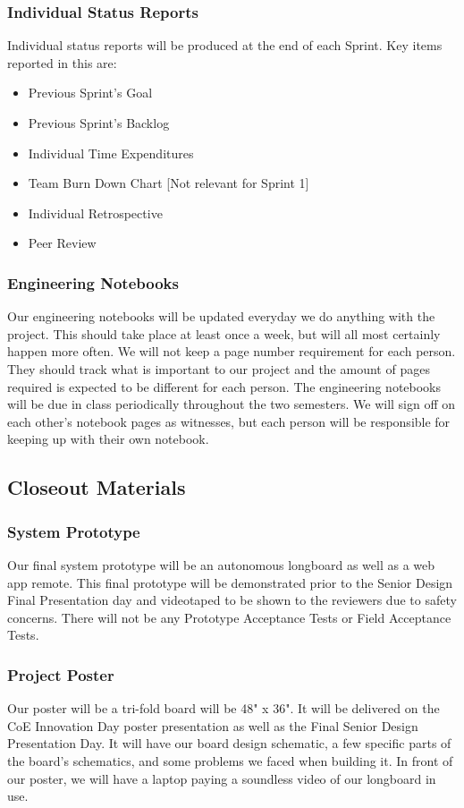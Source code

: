 \subsubsection{Individual Status Reports}
Individual status reports will be produced at the end of each Sprint. Key items reported in this are:
\begin{itemize}
  \item Previous Sprint's Goal
  \item Previous Sprint's Backlog
  \item Individual Time Expenditures
  \item Team Burn Down Chart [Not relevant for Sprint 1]
  \item Individual Retrospective
  \item Peer Review
\end{itemize}

\subsubsection{Engineering Notebooks}
Our engineering notebooks will be updated everyday we do anything with the project. This should take place at least once a week, but will all most certainly happen more often. We will not keep a page number requirement for each person. They should track what is important to our project and the amount of pages required is expected to be different for each person. The engineering notebooks will be due in class periodically throughout the two semesters. We will sign off on each other's notebook pages as witnesses, but each person will be responsible for keeping up with their own notebook.

\subsection{Closeout Materials}

\subsubsection{System Prototype}
Our final system prototype will be an autonomous longboard as well as a web app remote. This final prototype will be demonstrated prior to the Senior Design Final Presentation day and videotaped to be shown to the reviewers due to safety concerns. There will not be any Prototype Acceptance Tests or Field Acceptance Tests.

\subsubsection{Project Poster}
Our poster will be a tri-fold board will be 48" x 36". It will be delivered on the CoE Innovation Day poster presentation as well as the Final Senior Design Presentation Day. It will have our board design schematic, a few specific parts of the board's schematics, and some problems we faced when building it. In front of our poster, we will have a laptop paying a soundless video of our longboard in use.


